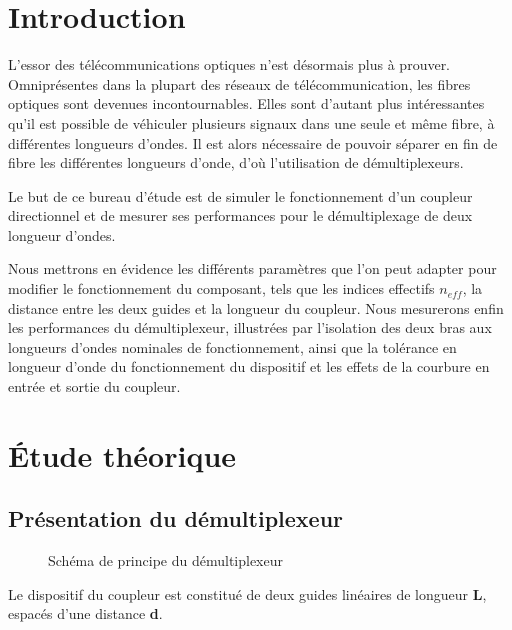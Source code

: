 \documentclass[a4paper,11pt]{report}
\begin{document}


\chapter*{Introduction}

L'essor des télécommunications optiques n'est désormais plus à prouver. Omniprésentes dans la plupart des réseaux de télécommunication, les fibres optiques sont devenues incontournables. Elles sont d'autant plus intéressantes qu'il est possible de véhiculer plusieurs signaux dans une seule et même fibre, à différentes longueurs d'ondes. \newline
Il est alors nécessaire de pouvoir séparer en fin de fibre les différentes longueurs d'onde, d'où l'utilisation de démultiplexeurs.

Le but de ce bureau d'étude est de simuler le fonctionnement d'un coupleur directionnel et de mesurer ses performances pour le démultiplexage de deux longueur d'ondes.

Nous mettrons en évidence les différents paramètres que l'on peut adapter pour modifier le fonctionnement du composant, tels que les indices effectifs $n_{eff}$, la distance entre les deux guides et la longueur du coupleur.
\newline
\indent Nous mesurerons enfin les performances du démultiplexeur, illustrées par l'isolation des deux bras aux longueurs d'ondes nominales de fonctionnement, ainsi que la tolérance en longueur d'onde du fonctionnement du dispositif et les effets de la courbure en entrée et sortie du coupleur.


\chapter{Étude théorique}

\section{Présentation du démultiplexeur}
\begin{figure}[H]
    \begin{center}
        
        \caption{Schéma de principe du démultiplexeur}
        \label{fig:}
    \end{center}
\end{figure}

Le dispositif du coupleur est constitué de deux guides linéaires de longueur \textbf{L}, espacés d'une distance \textbf{d}.
\end{document}
